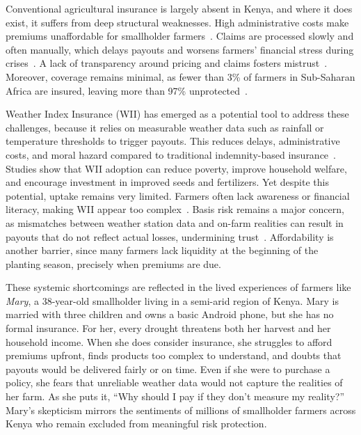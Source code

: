 \documentclass[11pt,a4paper]{article}
\begin{document}
		Conventional agricultural insurance is largely absent in Kenya, and where it does exist, it suffers from deep structural weaknesses.
		High administrative costs make premiums unaffordable for smallholder farmers~\parencite{DominguezAnguianoParte2024}.
		Claims are processed slowly and often manually, which delays payouts and worsens farmers' financial stress during crises~\parencite{Chainlink2021}.
		A lack of transparency around pricing and claims fosters mistrust~\parencite{DominguezAnguianoParte2024}.
		Moreover, coverage remains minimal, as fewer than 3\% of farmers in Sub-Saharan Africa are insured, leaving more than 97\% unprotected~\parencite{WorldBank2022}.

		Weather Index Insurance (WII) has emerged as a potential tool to address these challenges, because it relies on measurable weather data such as rainfall or temperature thresholds to trigger payouts.
		This reduces delays, administrative costs, and moral hazard compared to traditional indemnity-based insurance~\parencite{Jensen2016, Sibiko2018}.
		Studies show that WII adoption can reduce poverty, improve household welfare, and encourage investment in improved seeds and fertilizers.
		Yet despite this potential, uptake remains very limited.
		Farmers often lack awareness or financial literacy, making WII appear too complex~\parencite{Janzen2020}.
		Basis risk remains a major concern, as mismatches between weather station data and on-farm realities can result in payouts that do not reflect actual losses, undermining trust~\parencite{Jensen2016}.
		Affordability is another barrier, since many farmers lack liquidity at the beginning of the planting season, precisely when premiums are due.

		These systemic shortcomings are reflected in the lived experiences of farmers like \textit{Mary}, a 38-year-old smallholder living in a semi-arid region of Kenya.
		Mary is married with three children and owns a basic Android phone, but she has no formal insurance.
		For her, every drought threatens both her harvest and her household income.
		When she does consider insurance, she struggles to afford premiums upfront, finds products too complex to understand, and doubts that payouts would be delivered fairly or on time.
		Even if she were to purchase a policy, she fears that unreliable weather data would not capture the realities of her farm.
		As she puts it, \enquote{Why should I pay if they don't measure my reality?}
		Mary's skepticism mirrors the sentiments of millions of smallholder farmers across Kenya who remain excluded from meaningful risk protection.
\end{document}
